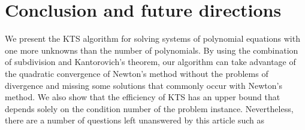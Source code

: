 \documentclass{article}
\begin{document}
\section{Conclusion and future directions}
\label{section_conclusion}

We present the KTS algorithm for solving systems of polynomial equations with one more unknowns than the number of polynomials.  By using the combination of subdivision and Kantorovich's theorem, our algorithm can take advantage of the
quadratic convergence of Newton's method without the problems of
divergence and missing some solutions that commonly occur with
Newton's method. We also show that the efficiency of KTS has an
upper bound that depends solely on the condition number of the
problem instance.  Nevertheless, there are a number of questions left
unanswered by this article such as
\end{document}
